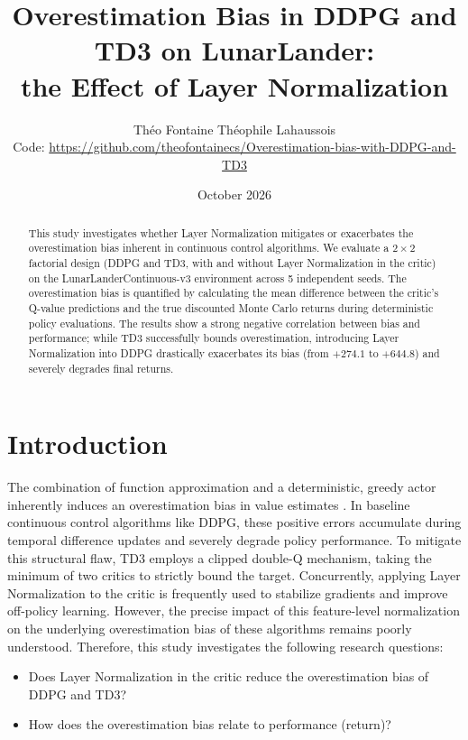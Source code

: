 \documentclass[10pt,a4paper]{article}
\title{Overestimation Bias in DDPG and TD3 on LunarLander:\\ the Effect of Layer Normalization}
\author{%
  \begin{tabular}{c}
    Théo Fontaine \qquad Théophile Lahaussois\\[0.4em]
    \small Code: \url{https://github.com/theofontainecs/Overestimation-bias-with-DDPG-and-TD3}
  \end{tabular}}
\date{October 2026}
\begin{document}
\maketitle

\begin{abstract}
This study investigates whether Layer Normalization mitigates or exacerbates the overestimation bias inherent in continuous control algorithms. We evaluate a $2 \times 2$ factorial design (DDPG and TD3, with and without Layer Normalization in the critic) on the LunarLanderContinuous-v3 environment across 5 independent seeds. The overestimation bias is quantified by calculating the mean difference between the critic's Q-value predictions and the true discounted Monte Carlo returns during deterministic policy evaluations. The results show a strong negative correlation between bias and performance; while TD3 successfully bounds overestimation, introducing Layer Normalization into DDPG drastically exacerbates its bias (from $+274.1$ to $+644.8$) and severely degrades final returns.
\end{abstract}

\section{Introduction}
\label{sec:intro}
The combination of function approximation and a deterministic, greedy actor inherently induces an overestimation bias in value estimates \citep{thrun1993issues,fujimoto2018td3}. In baseline continuous control algorithms like DDPG, these positive errors accumulate during temporal difference updates and severely degrade policy performance. To mitigate this structural flaw, TD3 employs a clipped double-Q mechanism, taking the minimum of two critics to strictly bound the target. Concurrently, applying Layer Normalization to the critic is frequently used to stabilize gradients and improve off-policy learning. However, the precise impact of this feature-level normalization on the underlying overestimation bias of these algorithms remains poorly understood. Therefore, this study investigates the following research questions:
\begin{itemize}
  \item[\textbf{Q1}] Does Layer Normalization in the critic reduce the overestimation bias of DDPG and TD3?
  \item[\textbf{Q2}] How does the overestimation bias relate to performance (return)?
\end{itemize}
\end{document}
